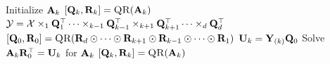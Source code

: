 
\begin{algorithmic}[1]
        \State Initialize $\mathbf{A}_k$
        \State $[\mat{Q}_k,\mat{R}_k] = \Call{QR}{\mat{A}_k}$  \label{l:qr_factor_q}
      \EndFor
          \State $\T{Y} =  \T{X} \times_1 \mat{Q}_1^\top \dots \times_{k-1} \mat{Q}_{k-1}^\top \times_{k+1} \mat{Q}_{k+1}^\top \dots \times_d \mat{Q}_d^\top$ \label{l:EXP-TTM}  
          \State $[\mat{Q}_0,\mat{R}_0] = \Call{QR}{\mat{R}_d \odot \cdots \odot \mat{R}_{k+1} \odot \mat{R}_{k-1} \odot \cdots \odot \mat{R}_1}$  \label{l:EXP-QR-R}
          \State $\mathbf{U}_k = \mathbf{Y}_{(k)}\mathbf{Q}_0$ \label{l:apply}  
          \State Solve $\mathbf{A}_k\mathbf{R}_0^\top = \mathbf{U}_k$ for $\mathbf{A}_k$  \label{l:cp-als-q-exp:solve}
          \State $[\mat{Q}_k,\mat{R}_k] = \Call{QR}{\mat{A}_k}$  \label{l:cp-als-q-exp:updateQR}
        \EndFor
      \EndWhile
    \EndFunction
  \end{algorithmic}